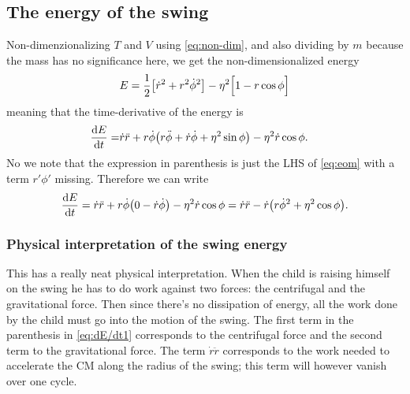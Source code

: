 \documentclass[11pt,letter, swedish, english
]{article}
\begin{document}
\subsection{The energy of the swing}
Non-dimenzionalizing $T$ and $V$ using \eqref{eq:non-dim}, %
and also dividing by $m$ because the mass has no significance here, we
get the non-dimensionalized energy  
\begin{equation}\label{eq:E}
E=\frac{1}{2}\qty[\dot{r}^2 + {r}^2\dot{\phi}^2] 
-\eta^2\Big[1-r\cos\phi\Big] 
\end{equation}
meaning that the time-derivative of the energy is
\begin{equation}
\begin{aligned}
\dv{E}{t}
=&\dot{r}\ddot{r}+r\dot\phi\qty(r\ddot\phi + \dot{r}\dot\phi + \eta^2\sin\phi) 
-\eta^2\dot{r}\cos\phi.
\end{aligned}
\end{equation}
No we note that the expression in parenthesis is just the LHS of
\eqref{eq:eom} with a term $r'\phi'$ missing. Therefore we can write
\begin{equation}\label{eq:dE/dt1}
\dv{E}{t}
=\dot{r}\ddot{r}+r\dot\phi\qty(0-\dot{r}\dot\phi)-\eta^2\dot{r}\cos\phi
=\dot{r}\ddot{r} - \dot{r}\qty(r\dot{\phi}^2 + \eta^2\cos\phi).
\end{equation}





\subsubsection{Physical interpretation of the swing energy}
\label{sec:phys_interp}
This has a really neat physical interpretation. When the child is
raising himself on the swing he has to do work against two forces:
the centrifugal and the gravitational force. Then since there's no
dissipation of energy, all the work done by the child must go into the
motion of the swing. 
The first term in the parenthesis in \eqref{eq:dE/dt1} corresponds
to the centrifugal force and the second term to the gravitational
force.
The term $\dot{r}\ddot{r}$ corresponds to the work needed to
accelerate the CM along the radius of the swing; this term will
however 
vanish over one cycle.\footnotemark{}  
\end{document}
